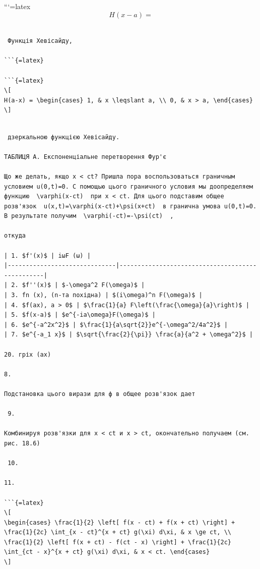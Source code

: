 \documentclass[
  ukrainian,
]{article}
\begin{document}
```{=latex}
\[
H(x-a) =
\]

\begin{verbatim}

 Функція Хевісайду, 

```{=latex}

```{=latex}
\[
H(a-x) = \begin{cases} 1, & x \leqslant a, \\ 0, & x > a, \end{cases}
\]
\end{verbatim}

\begin{verbatim}

 дзеркальною функцією Хевісайду.

ТАБЛИЦЯ A. Експоненціальне перетворення Фур'є

Що же делать, якщо x < ct? Пришла пора воспользоваться граничным условием u(0,t)=0. С помощью цього граничного условия мы доопределяем функцию  \varphi(x-ct)  при x < ct. Для цього подставим общее розв'язок  u(x,t)=\varphi(x-ct)+\psi(x+ct)  в гранична умова u(0,t)=0. В результате получим  \varphi(-ct)=-\psi(ct)  ,

откуда

| 1. $f'(x)$ | iωF (ω) |
|------------------------------|-------------------------------------------------|
| 2. $f''(x)$ | $-\omega^2 F(\omega)$ |
| 3. fn (x), (n-та похідна) | $(i\omega)^n F(\omega)$ |
| 4. $f(ax), a > 0$ | $\frac{1}{a} F\left(\frac{\omega}{a}\right)$ |
| 5. $f(x-a)$ | $e^{-ia\omega}F(\omega)$ |
| 6. $e^{-a^2x^2}$ | $\frac{1}{a\sqrt{2}}e^{-\omega^2/4a^2}$ |
| 7. $e^{-a_1 x}$ | $\sqrt{\frac{2}{\pi}} \frac{a}{a^2 + \omega^2}$ |

20. гріх (ax)

8.

Подстановка цього вирази для ф в общее розв'язок дает

 9.

Комбинируя розв'язки для x < ct и x > ct, окончательно получаем (см. рис. 18.6)

 10.

11.

```{=latex}
\[
\begin{cases} \frac{1}{2} \left[ f(x - ct) + f(x + ct) \right] + \frac{1}{2c} \int_{x - ct}^{x + ct} g(\xi) d\xi, & x \ge ct, \\ \frac{1}{2} \left[ f(x + ct) - f(ct - x) \right] + \frac{1}{2c} \int_{ct - x}^{x + ct} g(\xi) d\xi, & x < ct. \end{cases}
\]
\end{verbatim}
\end{document}
